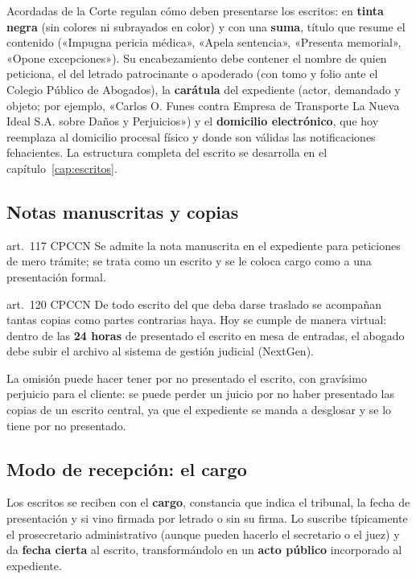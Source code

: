 \documentclass[12pt,oneside]{book}
\begin{document}
Acordadas de la Corte regulan cómo deben presentarse los escritos: en \textbf{tinta negra} (sin colores ni subrayados en color) y con una \textbf{suma}, título que resume el contenido («Impugna pericia médica», «Apela sentencia», «Presenta memorial», «Opone excepciones»). Su encabezamiento debe contener el nombre de quien peticiona, el del letrado patrocinante o apoderado (con tomo y folio ante el Colegio Público de Abogados), la \textbf{carátula} del expediente (actor, demandado y objeto; por ejemplo, «Carlos O. Funes contra Empresa de Transporte La Nueva Ideal S.A. sobre Daños y Perjuicios») y el \textbf{domicilio electrónico}, que hoy reemplaza al domicilio procesal físico y donde son válidas las notificaciones fehacientes. La estructura completa del escrito se desarrolla en el capítulo~\ref{cap:escritos}.

\subsection{Notas manuscritas y copias}

\begin{norma}{art.~117 CPCCN}
Se admite la nota manuscrita en el expediente para peticiones de mero trámite; se trata como un escrito y se le coloca cargo como a una presentación formal.
\end{norma}

\begin{norma}{art.~120 CPCCN}
De todo escrito del que deba darse traslado se acompañan tantas copias como partes contrarias haya. Hoy se cumple de manera virtual: dentro de las \textbf{24 horas} de presentado el escrito en mesa de entradas, el abogado debe subir el archivo al sistema de gestión judicial (NextGen).
\end{norma}

\begin{important}
La omisión puede hacer tener por no presentado el escrito, con gravísimo perjuicio para el cliente: se puede perder un juicio por no haber presentado las copias de un escrito central, ya que el expediente se manda a desglosar y se lo tiene por no presentado.
\end{important}

\subsection{Modo de recepción: el cargo}

Los escritos se reciben con el \textbf{cargo}, constancia que indica el tribunal, la fecha de presentación y si vino firmada por letrado o sin su firma. Lo suscribe típicamente el prosecretario administrativo (aunque pueden hacerlo el secretario o el juez) y da \textbf{fecha cierta} al escrito, transformándolo en un \textbf{acto público} incorporado al expediente.
\end{document}
